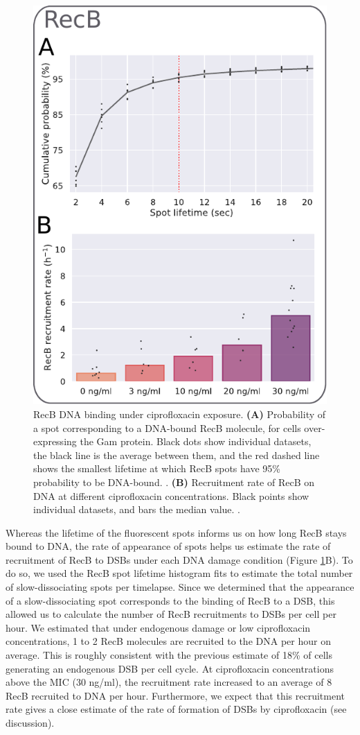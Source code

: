 \begin{figure}[htbp]
    \centering
    \includegraphics[width=.4\textwidth]{Figures/Fig2_RecB_recruitment.pdf}
    \caption{RecB DNA binding under ciprofloxacin exposure. \textbf{(A)} Probability of a spot corresponding to a DNA-bound RecB molecule, for cells over-expressing the Gam protein. Black dots show individual datasets, the black line is the average between them, and the red dashed line shows the smallest lifetime at which RecB spots have 95\% probability to be DNA-bound. .  \textbf{(B)} Recruitment rate of RecB on DNA at different ciprofloxacin concentrations. Black points show individual datasets, and bars the median value. . }
    \label{Fig:recruitment}
\end{figure}

Whereas the lifetime of the fluorescent spots informs us on how long RecB stays bound to DNA, the rate of appearance of spots helps us estimate the rate of recruitment of RecB to DSBs under each DNA damage condition (Figure \ref{Fig:recruitment}B). To do so, we used the RecB spot lifetime histogram fits to estimate the total number of slow-dissociating spots per timelapse. Since we determined that the appearance of a slow-dissociating spot corresponds to the binding of RecB to a DSB, this allowed us to calculate the number of RecB recruitments to DSBs per cell per hour. We estimated that under endogenous damage or low ciprofloxacin concentrations, 1 to 2 RecB molecules are recruited to the DNA per hour on average. This is roughly consistent with the previous estimate of 18\% of cells generating an endogenous DSB per cell cycle\cite{Sinha2018}. At ciprofloxacin concentrations above the MIC (30 ng/ml), the recruitment rate increased to an average of 8 RecB recruited to DNA per hour. Furthermore, we expect that this recruitment rate gives a close estimate of the rate of formation of DSBs by ciprofloxacin (see discussion).

